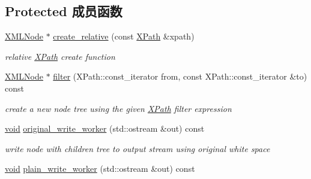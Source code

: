 \subsection*{Protected 成员函数}
\begin{DoxyCompactItemize}
\item 
\mbox{\label{struct_x_m_l_storage_1_1_x_m_l_node_a1d4c8696afd1d27a1b5eaa40f2f5beb6}} 
\hyperlink{struct_x_m_l_storage_1_1_x_m_l_node}{X\+M\+L\+Node} $\ast$ \hyperlink{struct_x_m_l_storage_1_1_x_m_l_node_a1d4c8696afd1d27a1b5eaa40f2f5beb6}{create\+\_\+relative} (const \hyperlink{struct_x_m_l_storage_1_1_x_path}{X\+Path} \&xpath)
\begin{DoxyCompactList}\small\item\em relative \hyperlink{struct_x_m_l_storage_1_1_x_path}{X\+Path} create function \end{DoxyCompactList}\item 
\mbox{\label{struct_x_m_l_storage_1_1_x_m_l_node_ac4d20aa988a840c088f91a6fac3ddafa}} 
\hyperlink{struct_x_m_l_storage_1_1_x_m_l_node}{X\+M\+L\+Node} $\ast$ \hyperlink{struct_x_m_l_storage_1_1_x_m_l_node_ac4d20aa988a840c088f91a6fac3ddafa}{filter} (X\+Path\+::const\+\_\+iterator from, const X\+Path\+::const\+\_\+iterator \&to) const
\begin{DoxyCompactList}\small\item\em create a new node tree using the given \hyperlink{struct_x_m_l_storage_1_1_x_path}{X\+Path} filter expression \end{DoxyCompactList}\item 
\mbox{\label{struct_x_m_l_storage_1_1_x_m_l_node_adb0495c6cb85a4c517489f05186f02bf}} 
\hyperlink{interfacevoid}{void} \hyperlink{struct_x_m_l_storage_1_1_x_m_l_node_adb0495c6cb85a4c517489f05186f02bf}{original\+\_\+write\+\_\+worker} (std\+::ostream \&out) const
\begin{DoxyCompactList}\small\item\em write node with children tree to output stream using original white space \end{DoxyCompactList}\item 
\mbox{\label{struct_x_m_l_storage_1_1_x_m_l_node_a9fb3565ac49a880d9c6b6a9890243e7f}} 
\hyperlink{interfacevoid}{void} \hyperlink{struct_x_m_l_storage_1_1_x_m_l_node_a9fb3565ac49a880d9c6b6a9890243e7f}{plain\+\_\+write\+\_\+worker} (std\+::ostream \&out) const

\end{DoxyCompactItemize}
